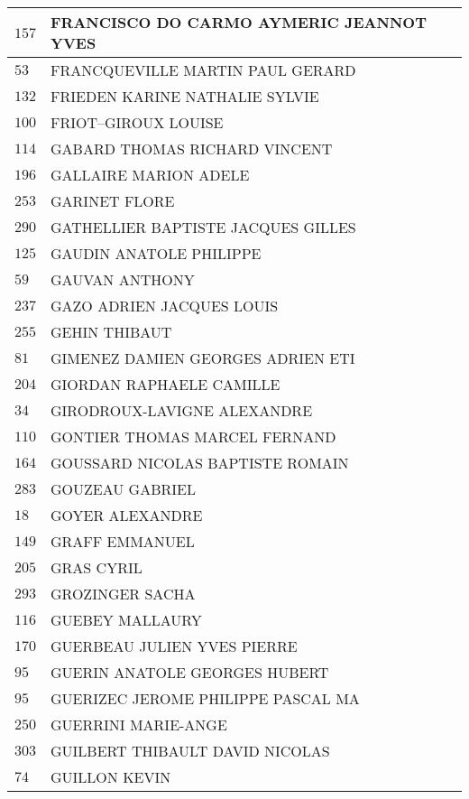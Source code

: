 \begin{xltabular}{\linewidth}{|l|X|}
    \hline
    $157$ & FRANCISCO DO CARMO AYMERIC JEANNOT YVES \\
    \hline
    $53$ & FRANCQUEVILLE MARTIN PAUL GERARD \\
    \hline
    $132$ & FRIEDEN KARINE NATHALIE SYLVIE \\
    \hline
    $100$ & FRIOT--GIROUX LOUISE \\
    \hline
    $114$ & GABARD THOMAS RICHARD VINCENT \\
    \hline
    $196$ & GALLAIRE MARION ADELE \\
    \hline
    $253$ & GARINET FLORE \\
    \hline
    $290$ & GATHELLIER BAPTISTE JACQUES GILLES \\
    \hline
    $125$ & GAUDIN ANATOLE PHILIPPE \\
    \hline
    $59$ & GAUVAN ANTHONY \\
    \hline
    $237$ & GAZO ADRIEN JACQUES LOUIS \\
    \hline
    $255$ & GEHIN THIBAUT \\
    \hline
    $81$ & GIMENEZ DAMIEN GEORGES ADRIEN ETI \\
    \hline
    $204$ & GIORDAN RAPHAELE CAMILLE \\
    \hline
    $34$ & GIRODROUX-LAVIGNE ALEXANDRE \\
    \hline
    $110$ & GONTIER THOMAS MARCEL FERNAND \\
    \hline
    $164$ & GOUSSARD NICOLAS BAPTISTE ROMAIN \\
    \hline
    $283$ & GOUZEAU GABRIEL \\
    \hline
    $18$ & GOYER ALEXANDRE \\
    \hline
    $149$ & GRAFF EMMANUEL \\
    \hline
    $205$ & GRAS CYRIL \\
    \hline
    $293$ & GROZINGER SACHA \\
    \hline
    $116$ & GUEBEY MALLAURY \\
    \hline
    $170$ & GUERBEAU JULIEN YVES PIERRE \\
    \hline
    $95$ & GUERIN ANATOLE GEORGES HUBERT \\
    \hline
    $95$ & GUERIZEC JEROME PHILIPPE PASCAL MA \\
    \hline
    $250$ & GUERRINI MARIE-ANGE \\
    \hline
    $303$ & GUILBERT THIBAULT DAVID NICOLAS \\
    \hline
    $74$ & GUILLON KEVIN \\

\end{xltabular}
